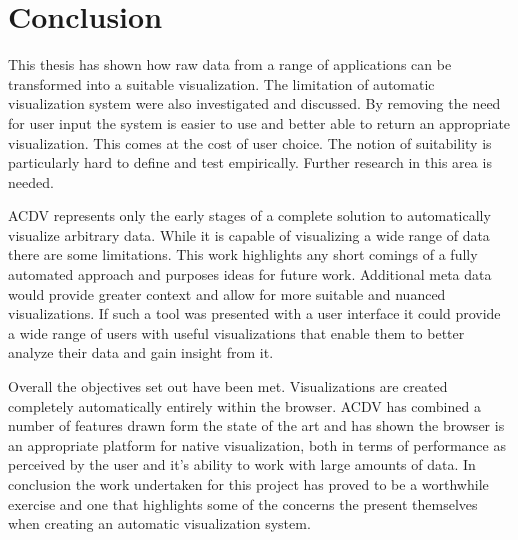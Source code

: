 \documentclass[a4paper, 11pt, titlepage, onehalfspacing]{report}
\begin{document}
\section{Conclusion}
This thesis has shown how raw data from a range of applications can be transformed into a suitable visualization. The limitation of automatic visualization system were also investigated and discussed. By removing the need for user input the system is easier to use and better able to return an appropriate visualization. This comes at the cost of user choice. The notion of suitability is particularly hard to define and test empirically. Further research in this area is needed.

AC\lightning{}DV represents only the early stages of a complete solution to automatically visualize arbitrary data. While it is capable of visualizing a wide range of data there are some limitations. This work highlights any short comings of a fully automated approach and purposes ideas for future work. Additional meta data would provide greater context and allow for more suitable and nuanced visualizations. If such a tool was presented with a user interface it could provide a wide range of users with useful visualizations that enable them to better analyze their data and gain insight from it.

Overall the objectives set out have been met. Visualizations are created completely automatically entirely within the browser. AC\lightning{}DV has combined a number of features drawn form the state of the art and has shown the browser is an appropriate platform for native visualization, both in terms of performance as perceived by the user and it's ability to work with large amounts of data. In conclusion the work undertaken for this project has proved to be a worthwhile exercise and one that highlights some of the concerns the present themselves when creating an automatic visualization system.







\end{document}
